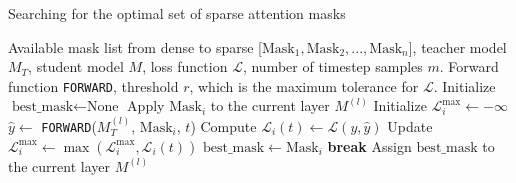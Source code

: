 \begin{algorithm}[t]
\caption{Searching for the optimal set of sparse attention masks}%
\label{alg:search}
\begin{algorithmic}[1] 

\Require Available mask list from dense to sparse [$\text{Mask}_1, \text{Mask}_2, ..., \text{Mask}_n$], teacher model $M_T$, student model $M$, loss function $\mathcal{L}$, number of timestep samples $m$.
\Require Forward function \texttt{FORWARD}, threshold $r$, which is the maximum tolerance for $\mathcal{L}$.
\Require 
{}
    \State Initialize $\text{best\_mask} \gets \text{None}$ 
     \textcolor{blue}{}
        \State Apply $\text{Mask}_i$ to the current layer $M^{(l)}$
        \State Initialize $\mathcal{L}_i^{\max} \gets -\infty$ \textcolor{blue}{
        }
            \State $\hat{y} \gets$ \texttt{FORWARD}($M_{T}^{(l)}$, $\text{Mask}_i$, $t$)
            \State Compute $\mathcal{L}_i(t) \gets \mathcal{L}(y, \hat{y})$
            \State Update $\mathcal{L}_i^{\max} \gets \max(\mathcal{L}_i^{\max}, \mathcal{L}_i(t))$ \textcolor{blue}{
            }
        \EndFor
            \State $\text{best\_mask} \gets \text{Mask}_i$ \textcolor{blue}{
            }
        \Else 
            \State \textbf{break}
        \EndIf
    \EndFor
    \State Assign $\text{best\_mask}$ to the current layer $M^{(l)}$
    
\EndFor
\end{algorithmic} 
\end{algorithm}




